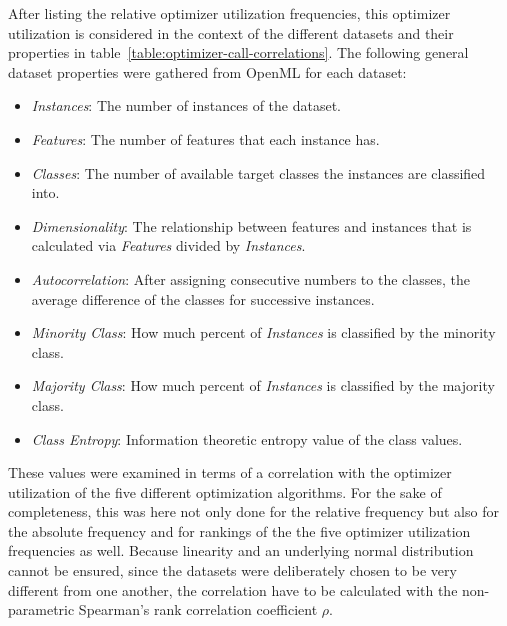 After listing the relative optimizer utilization frequencies, this optimizer utilization is considered in the context of the different datasets and their properties in table~\ref{table:optimizer-call-correlations}.
The following general dataset properties were gathered from OpenML for each dataset:
\begin{itemize}
    \item \textit{Instances}: The number of instances of the dataset.
    \item \textit{Features}: The number of features that each instance has.
    \item \textit{Classes}: The number of available target classes the instances are classified into.
    \item \textit{Dimensionality}: The relationship between features and instances that is calculated via \textit{Features} divided by \textit{Instances}.
    \item \textit{Autocorrelation}: After assigning consecutive numbers to the classes, the average difference of the classes for successive instances.
    \item \textit{Minority Class}: How much percent of \textit{Instances} is classified by the minority class.
    \item \textit{Majority Class}: How much percent of \textit{Instances} is classified by the majority class.
    \item \textit{Class Entropy}: Information theoretic entropy value of the class values.
\end{itemize}
These values were examined in terms of a correlation with the optimizer utilization of the five different optimization algorithms.
For the sake of completeness, this was here not only done for the relative frequency but also for the absolute frequency and for rankings of the the five optimizer utilization frequencies as well.\newline
Because linearity and an underlying normal distribution cannot be ensured, since the datasets were deliberately chosen to be very different from one another, the correlation have to be calculated with the non-parametric Spearman's rank correlation coefficient $\rho$.

